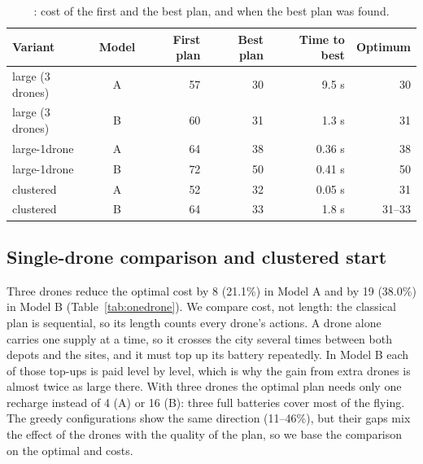 \documentclass[11pt,a4paper]{article}
\newcommand{\p}[1]{\texttt{\detokenize{#1}}}
\begin{document}
\begin{table}[H]
  \centering\small
  \begin{tabular}{@{}l c r r r r@{}}
    \toprule
    Variant & Model & First plan & Best plan & Time to best & Optimum \\
    \midrule
    large (3 drones)   & A & 57 & 30 & 9.5 s  & 30 \\
    large (3 drones)   & B & 60 & 31 & 1.3 s  & 31 \\
    large-1drone       & A & 64 & 38 & 0.36 s & 38 \\
    large-1drone       & B & 72 & 50 & 0.41 s & 50 \\
    clustered          & A & 52 & 32 & 0.05 s & 31 \\
    clustered          & B & 64 & 33 & 1.8 s  & 31--33 \\
    \bottomrule
  \end{tabular}
  \caption{\p{lama}: cost of the first and the best plan, and when the best plan was found.}
  \label{tab:lama}
\end{table}

\subsection{Single-drone comparison and clustered start}
Three drones reduce the optimal cost by 8 (21.1\%) in Model A and by 19
(38.0\%) in Model B (Table~\ref{tab:onedrone}). We compare cost, not length:
the classical plan is sequential, so its length counts every drone's actions.
A drone alone carries one supply at a time, so it
crosses the city several times between both depots and the sites, and it
must top up its battery repeatedly. In Model B each of those top-ups is paid
level by level, which is why the gain from extra drones is almost twice as
large there. With three drones the optimal plan needs only one recharge instead
of 4 (A) or 16 (B): three full batteries cover most of the flying. The greedy configurations show the same
direction (11--46\%), but their gaps mix the effect of the drones with the
quality of the plan, so we base the comparison on the optimal and \p{lama}
costs.
\end{document}
